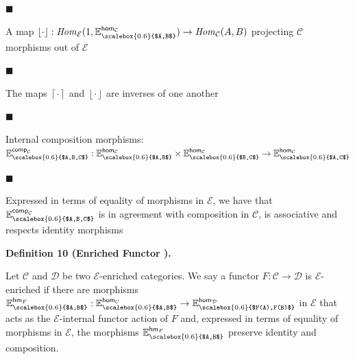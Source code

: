  
 
\par\noindent  $\blacksquare$ 
 
A map $\left\lfloor{\cdot}\right\rfloor:\mathit{Hom}_{\mathcal{E}}(1,\mathbb{E}^{\mathsf{hom}_{\mathcal{C}}}_{\scalebox{0.6}{$A,B$}})\to\mathit{Hom}_{\mathcal{C}}(A,B)$ projecting $\mathcal{C}$ morphisms out of $\mathcal{E}$\par
 
 
 
\par\noindent  $\blacksquare$ 
 
The maps $\left\lceil{\cdot}\right\rceil$ and $\left\lfloor{\cdot}\right\rfloor$ are inverses of one another\par
 
 
 
\par\noindent  $\blacksquare$ 
 
Internal composition morphisms: $\mathbb{E}^{\mathsf{comp}_{\mathcal{C}}}_{\scalebox{0.6}{$A,B,C$}}:\mathbb{E}^{\mathsf{hom}_{\mathcal{C}}}_{\scalebox{0.6}{$A,B$}}\times\mathbb{E}^{\mathsf{hom}_{\mathcal{C}}}_{\scalebox{0.6}{$B,C$}}\to\mathbb{E}^{\mathsf{hom}_{\mathcal{C}}}_{\scalebox{0.6}{$A,C$}}$\par
 
 
 
\par\noindent  $\blacksquare$ 
 
Expressed in terms of equality of morphisms in $\mathcal{E}$, we have that $\mathbb{E}^{\mathsf{comp}_{\mathcal{C}}}_{\scalebox{0.6}{$A,B,C$}}$ is in agreement with composition in $\mathcal{C}$, is associative and respects identity morphisms\par
 
 
  
 
 
 
\par\medskip\noindent\textbf{Definition 10 (Enriched Functor ).}\par
 
 
Let $\mathcal{C}$ and $\mathcal{D}$ be two $\mathcal{E}$-enriched categories. We say a functor $F:\mathcal{C}\to\mathcal{D}$ is $\mathcal{E}$-enriched if there are morphisms $\mathbb{E}^{\mathsf{hm}_{F}}_{\scalebox{0.6}{$A,B$}}:\mathbb{E}^{\mathsf{hom}_{\mathcal{C}}}_{\scalebox{0.6}{$A,B$}}\to\mathbb{E}^{\mathsf{hom}_{\mathcal{D}}}_{\scalebox{0.6}{$F(A),F(B)$}}$ in $\mathcal{E}$ that acts as the $\mathcal{E}$-internal functor action of $F$ and, expressed in terms of equality of morphisms in $\mathcal{E}$, the morphisms $\mathbb{E}^{\mathsf{hm}_{F}}_{\scalebox{0.6}{$A,B$}}$ preserve identity and composition.\par
 
